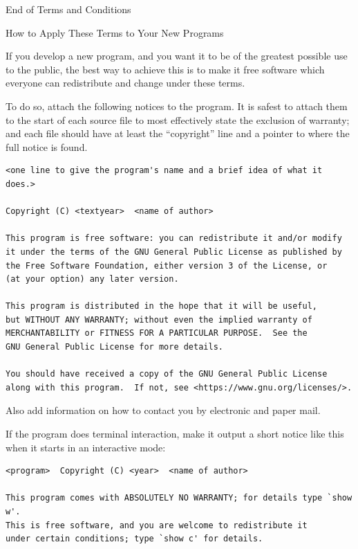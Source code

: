 \documentclass[11pt,twoside,fleqn,openright,titlepage]{cslreport}
\begin{document}
\begin{small}
\begin{enumerate}
\begin{center}
{\Large\sc End of Terms and Conditions}

\bigskip
How to Apply These Terms to Your New Programs
\end{center}

If you develop a new program, and you want it to be of the greatest
possible use to the public, the best way to achieve this is to make it
free software which everyone can redistribute and change under these terms.

To do so, attach the following notices to the program.  It is safest
to attach them to the start of each source file to most effectively
state the exclusion of warranty; and each file should have at least
the ``copyright'' line and a pointer to where the full notice is found.

{\scriptsize
\begin{verbatim}
<one line to give the program's name and a brief idea of what it does.>

Copyright (C) <textyear>  <name of author>

This program is free software: you can redistribute it and/or modify
it under the terms of the GNU General Public License as published by
the Free Software Foundation, either version 3 of the License, or
(at your option) any later version.

This program is distributed in the hope that it will be useful,
but WITHOUT ANY WARRANTY; without even the implied warranty of
MERCHANTABILITY or FITNESS FOR A PARTICULAR PURPOSE.  See the
GNU General Public License for more details.

You should have received a copy of the GNU General Public License
along with this program.  If not, see <https://www.gnu.org/licenses/>.
\end{verbatim}
}

Also add information on how to contact you by electronic and paper mail.

If the program does terminal interaction, make it output a short
notice like this when it starts in an interactive mode:

{\scriptsize
\begin{verbatim}
<program>  Copyright (C) <year>  <name of author>

This program comes with ABSOLUTELY NO WARRANTY; for details type `show w'.
This is free software, and you are welcome to redistribute it
under certain conditions; type `show c' for details.
\end{verbatim}
}


\end{enumerate}
\end{small}
\end{document}
